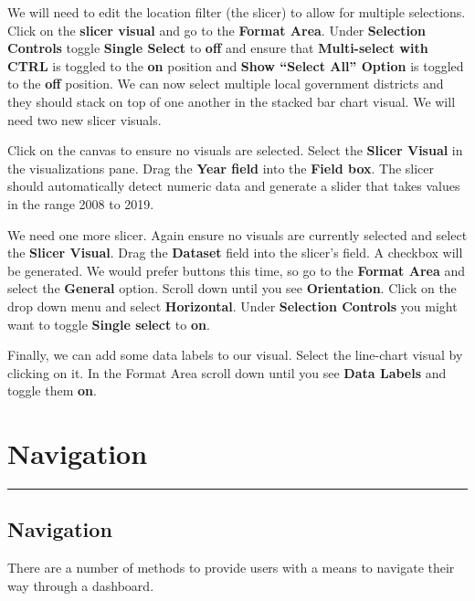 \documentclass[
]{book}
\begin{document}
We will need to edit the location filter (the slicer) to allow for multiple selections. Click on the \textbf{slicer visual} and go to the \textbf{Format Area}. Under \textbf{Selection Controls} toggle \textbf{Single Select} to \textbf{off} and ensure that \textbf{Multi-select with CTRL} is toggled to the \textbf{on} position and \textbf{Show ``Select All'' Option} is toggled to the \textbf{off} position. We can now select multiple local government districts and they should stack on top of one another in the stacked bar chart visual. We will need two new slicer visuals.

Click on the canvas to ensure no visuals are selected. Select the \textbf{Slicer Visual} in the visualizations pane. Drag the \textbf{Year field} into the \textbf{Field box}. The slicer should automatically detect numeric data and generate a slider that takes values in the range 2008 to 2019.

We need one more slicer. Again ensure no visuals are currently selected and select the \textbf{Slicer Visual}. Drag the \textbf{Dataset} field into the slicer's field. A checkbox will be generated. We would prefer buttons this time, so go to the \textbf{Format Area} and select the \textbf{General} option. Scroll down until you see \textbf{Orientation}. Click on the drop down menu and select \textbf{Horizontal}. Under \textbf{Selection Controls} you might want to toggle \textbf{Single select} to \textbf{on}.

Finally, we can add some data labels to our visual. Select the line-chart visual by clicking on it. In the Format Area scroll down until you see \textbf{Data Labels} and toggle them \textbf{on}.

\hypertarget{navigation}{%
\chapter{Navigation}\label{navigation}}

\begin{center}\rule{0.5\linewidth}{0.5pt}\end{center}

\hypertarget{navigation-1}{%
\section{Navigation}\label{navigation-1}}

There are a number of methods to provide users with a means to navigate their way through a dashboard.
\end{document}
